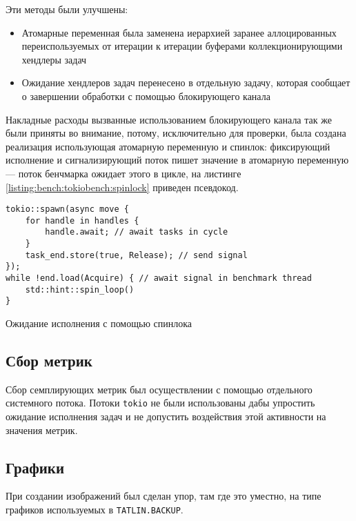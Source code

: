 Эти методы были улучшены:

\begin{itemize}
    \item Атомарные переменная была заменена иерархией заранее аллоцированных переиспользуемых от итерации к итерации буферами коллекционирующими хендлеры задач
    \item Ожидание хендлеров задач перенесено в отдельную задачу, которая сообщает о завершении обработки с помощью блокирующего канала
\end{itemize}

Накладные расходы вызванные использованием блокирующего канала так же были приняты во внимание, потому, исключительно для проверки, была создана реализация использующая атомарную переменную и спинлок: фиксирующий исполнение и сигнализирующий поток пишет значение в атомарную переменную --- поток бенчмарка ожидает этого в цикле, на листинге \ref{listing:bench:tokiobench:spinlock} приведен псевдокод.

\begin{listing}[H]
    \begin{verbatim}
tokio::spawn(async move {
    for handle in handles {
        handle.await; // await tasks in cycle
    }
    task_end.store(true, Release); // send signal
});
while !end.load(Acquire) { // await signal in benchmark thread
    std::hint::spin_loop()
}
    \end{verbatim}
    \caption{Ожидание исполнения с помощью спинлока}
    \label{listing:bench:tokiobench:spinlock}
\end{listing}

\subsection{Сбор метрик}

Сбор семплирующих метрик был осуществлении с помощью отдельного системного потока. Потоки \verb|tokio| не были использованы дабы упростить ожидание исполнения задач и не допустить воздействия этой активности на значения метрик.

\subsection{Графики}

При создании изображений был сделан упор, там где это уместно, на типе графиков используемых в \verb|TATLIN.BACKUP|.
